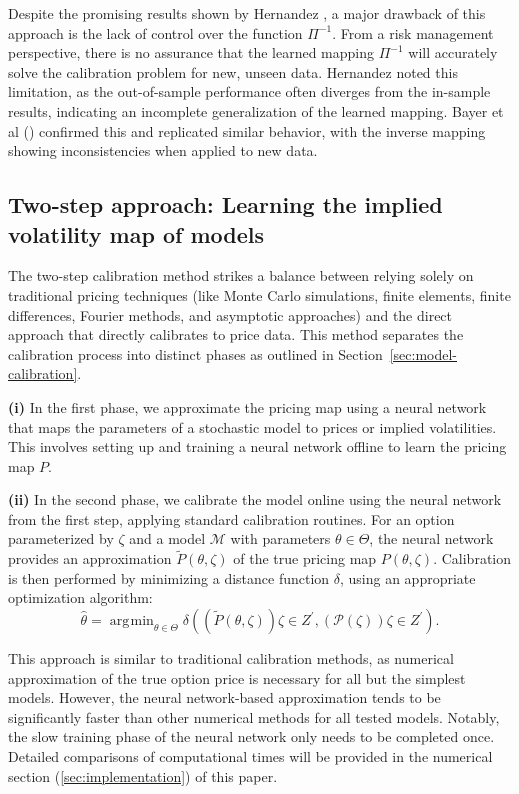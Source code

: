 \documentclass{article}
\theoremstyle{remark}
\DeclareMathOperator*{\argmin}{\arg\!\min}
\begin{document}
Despite the promising results shown by Hernandez \cite{Hernandez}, a major drawback of this approach
is the lack of control over the function $\Pi^{-1}$.
From a risk management perspective, there is no assurance that the learned mapping $\Pi^{-1}$ will accurately
solve the calibration problem for new, unseen data.
Hernandez noted this limitation, as the out-of-sample performance often diverges from the
in-sample results, indicating an incomplete generalization of the learned mapping.
Bayer et al (\cite{BHMST19}) confirmed this and replicated similar behavior,
with the inverse mapping showing inconsistencies when applied to new data.

\subsection{Two-step approach: Learning the implied volatility map of models}
\label{sec:separation}

The two-step calibration method strikes a balance between relying solely on traditional pricing techniques
(like Monte Carlo simulations, finite elements, finite differences, Fourier methods, and asymptotic approaches)
and the direct approach that directly calibrates to price data.
This method separates the calibration process into distinct phases as outlined in Section~\ref{sec:model-calibration}.

\textbf{(i)} In the first phase, we approximate the pricing map using a neural network that maps the parameters of a stochastic model to prices or implied volatilities. This involves setting up and training a neural network offline to learn the pricing map $P$.

\textbf{(ii)} In the second phase, we calibrate the model online using the neural network from the first step, applying standard calibration routines. For an option parameterized by $\zeta$ and a model $\mathcal{M}$ with parameters $\theta \in \Theta$, the neural network provides an approximation $\widetilde{P}(\theta, \zeta)$ of the true pricing map $P(\theta, \zeta)$. Calibration is then performed by minimizing a distance function $\delta$, using an appropriate optimization algorithm:
\begin{equation}\label{eq
}
\widehat{\theta} = \argmin_{\theta \in \Theta} \delta\left( \left( \widetilde{P}(\theta, \zeta) \right){\zeta \in Z^\prime}, \left( \mathcal{P}(\zeta) \right){\zeta \in Z^\prime} \right).
\end{equation}

This approach is similar to traditional calibration methods, as numerical approximation of the true option price
is necessary for all but the simplest models.
However, the neural network-based approximation tends to be significantly faster than other numerical methods for all tested models.
Notably, the slow training phase of the neural network only needs to be completed once.
Detailed comparisons of computational times will be provided in the numerical section (\ref{sec:implementation}) of this paper.
\end{document}
